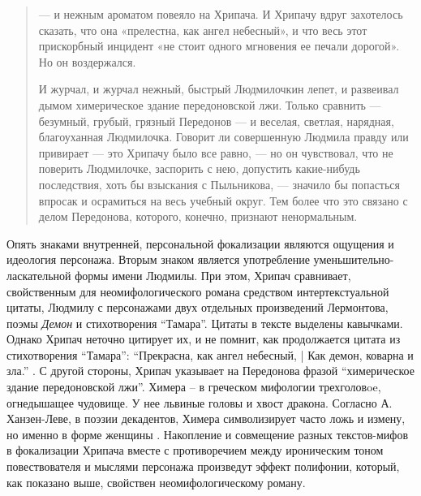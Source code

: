 \documentclass[12pt,a4paper]{article}
\begin{document}
\begin{quote}

— и нежным ароматом повеяло на Хрипача. И Хрипачу
вдруг захотелось сказать, что она «прелестна, как ангел небесный», и
что весь этот прискорбный инцидент «не стоит одного мгновения ее
печали дорогой». Но он воздержался.

И журчал, и журчал нежный, быстрый Людмилочкин лепет, и
развеивал дымом химерическое здание передоновской лжи. Только
сравнить — безумный, грубый, грязный Передонов — и веселая, светлая,
нарядная, благоуханная Людмилочка. Говорит ли совершенную
Людмила правду или привирает — это Хрипачу было все равно, — но он
чувствовал, что не поверить Людмилочке, заспорить с нею, допустить
какие-нибудь последствия, хоть бы взыскания с Пыльникова, — значило
бы попасться впросак и осрамиться на весь учебный округ. Тем более
что это связано с делом Передонова, которого, конечно, признают
ненормальным.

\parencite[240.]{sologub2004}
\end{quote}

Опять знаками внутренней, персональной фокализации являются ощущения и идеология персонажа. Вторым знаком является употребление уменьшительно-ласкательной формы имени Людмилы.  При этом, Хрипач сравнивает, свойственным для неомифологического романа средством интертекстуальной цитаты, Людмилу с персонажами двух отдельных произведений Лермонтова, поэмы \emph{Демон} и стихотворения \enquote{Тамара}. Цитаты в тексте выделены кавычками. Однако Хрипач неточно цитирует их, и не помнит, как продолжается цитата из стихотворения \enquote{Тамара}: \enquote{Прекрасна, как ангел небесный, | Как демон, коварна и зла.} \parencite[194]{lermontov2000}. С другой стороны, Хрипач указывает на Передонова фразой \enquote{химерическое здание передоновской лжи}. Химера – в греческом мифологии трехголовoe, огнедышащее чудовище. У нее львиные головы и хвост дракона. Согласно А. Ханзен-Леве, в поэзии декадентов, Химера символизирует часто ложь и измену, но именно в форме женщины \parencite[200]{hansen-love1999}. Накопление и совмещение разных текстов-мифов в фокализации Хрипача вместе с противоречием между ироническим тоном повествователя и мыслями персонажа произведут эффект полифонии, который, как показано выше, свойствен неомифологическому роману.
\end{document}
